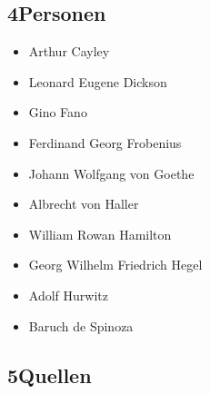 \documentclass[11pt,a4paper]{article}
\begin{document}
\subsection*{4\quad Personen}

\begin{itemize}[leftmargin=1.2em,itemsep=0pt]
\item Arthur Cayley
\item Leonard Eugene Dickson
\item Gino Fano
\item Ferdinand Georg Frobenius
\item Johann Wolfgang von Goethe
\item Albrecht von Haller
\item William Rowan Hamilton
\item Georg Wilhelm Friedrich Hegel
\item Adolf Hurwitz
\item Baruch de Spinoza
\end{itemize}

\subsection*{5\quad Quellen}
\end{document}
